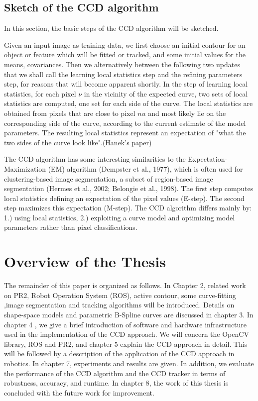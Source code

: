 \subsection{Sketch of the CCD algorithm}
\label{sec:sccd}

In this section, the basic steps of the CCD algorithm will be sketched.

Given an input image as training data, we first choose an initial
contour for an object or feature which will be fitted or tracked, and
some initial values for the means, covariances. Then we alternatively
between the following two updates that we shall call the learning
local statistics step and the refining parameters step, for reasons
that will become apparent shortly.
In the step of learning local statistics, for each pixel $\nu$ in the
vicinity of the expected curve, two sets of local statistics
are computed, one set for each side of the curve. The local statistics are obtained from
pixels that are close to pixel $nu$ and most likely lie on the corresponding side of the curve,
according to the current estimate of the model parameters. The resulting local statistics
represent an expectation of "what the two sides of the curve look
like".(Hanek's paper)

The CCD algorithm has some interesting similarities to the Expectation-Maximization
(EM) algorithm (Dempster et al., 1977), which is often used for clustering-based image
segmentation, a subset of region-based image segmentation (Hermes et al., 2002; Belongie
et al., 1998). The first step computes local statistics defining an expectation of the pixel
values (E-step). The second step maximizes this expectation
(M-step). The CCD algorithm differs mainly by: 1.) using local
statistics, 2.) exploiting a curve model and optimizing model
parameters rather than pixel classifications.


\section{Overview of the Thesis}
\label{sec:overview}
The remainder of this paper is organized as follows. In Chapter 2,
related work on PR2, Robot Operation System (ROS), active contour,
some curve-fitting ,image segmentation and tracking algorithms will be
introduced. Details on shape-space models and parametric
B-Spline curves are discussed in chapter 3. In chapter 4 , we give a brief introduction of software
and hardware infrastructure used in the implementation of the CCD
approach. We will concern the OpenCV library, ROS and PR2, and chapter
5 explain the CCD approach in detail. This will be followed by a
description of the application of the CCD approach in
robotics. In chapter 7, experiments and results are given. In
addition, we evaluate the performance of the CCD algorithm and the CCD
tracker in terms of robustness, accuracy, and runtime. In chapter 8,
the work of this thesis is concluded with the future work for improvement.



